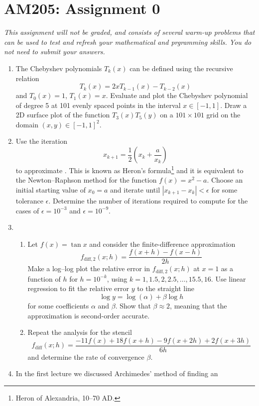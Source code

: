 \documentclass[12pt]{article}
\begin{document}
\section*{AM205: Assignment 0}

{\it This assignment will not be graded, and consists of several warm-up problems that can be used
to test and refresh your mathematical and prgramming skills. You do not need to submit your answers.}

\begin{enumerate}
  \item The Chebyshev polynomials $T_k(x)$ can be defined using the recursive relation
    \[
    T_k(x) = 2xT_{k-1}(x) - T_{k-2} (x)
    \]
    and $T_0(x)=1$, $T_1(x)=x$. Evaluate and plot the Chebyshev polynomial of
    degree 5 at 101 evenly spaced points in the interval $x\in [-1,1]$. Draw a
    2D surface plot of the function $T_3(x)T_5(y)$ on a $101\times 101$ grid on
    the domain $(x,y) \in [-1,1]^2$.
  \item Use the iteration
    \[
    x_{k+1} = \frac{1}{2} \left( x_k + \frac{a}{x_k} \right)
    \]
    to approximate . This is known as Heron's
    formula\footnote{Heron of Alexandria, 10--70 AD.} and it is equivalent to
    the Newton--Raphson method for the function $f(x)=x^2-a$. Choose an initial
    starting value of $x_0=a$ and iterate until $|x_{k+1} - x_k|<\epsilon$ for
    some tolerance $\epsilon$. Determine the number of iterations required to
    compute  for the cases of $\epsilon=10^{-3}$ and
    $\epsilon=10^{-9}$.
  \item
    \begin{enumerate}
      \item Let $f(x)=\tan x$ and consider the finite-difference approximation
	\[
	f_{\text{diff},2}(x;h) = \frac{f(x+h)-f(x-h)}{2h}
	\]
	Make a log--log plot the relative error in $f_{\text{diff},2}(x;h)$ at
	$x=1$ as a function of $h$ for $h=10^{-k}$, using
	$k=1,1.5,2,2.5,\ldots, 15.5, 16$. Use linear regression to fit the
	relative error $y$ to the straight line
	\[
	\log y = \log(\alpha) + \beta \log h
	\]
	for some coefficients $\alpha$ and $\beta$. Show that $\beta\approx 2$,
	meaning that the approximation is second-order accurate.
      \item Repeat the analysis for the stencil
	\[
	f_{\text{diff}}(x;h) = \frac{-11f(x) + 18 f(x+h) - 9f(x+2h) + 2f(x+3h)}{6h}
	\]
	and determine the rate of convergence $\beta$.
    \end{enumerate}
  \item In the first lecture we discussed Archimedes' method of finding an

\end{enumerate}
\end{document}
